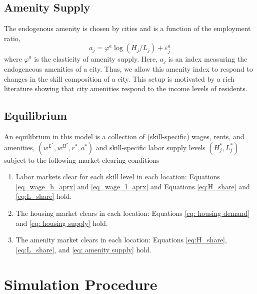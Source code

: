 \documentclass{article}
\begin{document}
\subsection{Amenity Supply}
The endogenous amenity is chosen by cities and is a function of the employment ratio,
\begin{equation}\label{eq: amenity supply} 
a_{j} = \varphi^a \log(H_{j}/L_{j}) + \varepsilon^a_{j} \end{equation}
where $\varphi^a$ is the elasticity of amenity supply. Here, $a_{j}$ is an index measuring the endogeneous amenities of a city. Thus, we allow this amenity index to respond to changes in the skill composition of a city. This setup is motivated by a rich literature showing that city amenities respond to the income levels of residents. 



\subsection{Equilibrium}
An equilibrium in this model is a collection of (skill-specific) wages, rents, and amenities, $(w^{L^*},w^{H^*},r^*,a^*)$ and skill-specific labor supply levels $(H_{j}^*,L_{j}^*)$ subject to the following market clearing conditions 
\begin{enumerate}
\item Labor markets clear for each skill level in each location: Equations \ref{eq_wage_h_aprx} and \ref{eq_wage_l_aprx} and Equations \ref{eq:H_share} and \ref{eq:L_share} hold. 
\item The housing market clears in each location: Equations \ref{eq: housing demand} and \ref{eq: housing supply} hold.

\item The amenity market clears in each location: 
Equations \ref{eq:H_share}, \ref{eq:L_share}, and \ref{eq: amenity supply} hold. 
\end{enumerate}

\section{Simulation Procedure}
\end{document}
